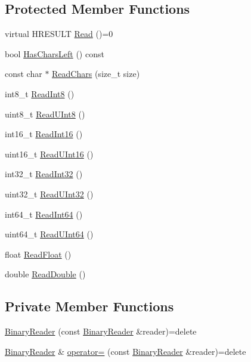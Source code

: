 \subsection*{Protected Member Functions}
\begin{DoxyCompactItemize}
\item 
virtual H\+R\+E\+S\+U\+LT \hyperlink{classmage_1_1_binary_reader_a000cf97b640a5fbd1d5c33ccaae7fb39}{Read} ()=0
\item 
bool \hyperlink{classmage_1_1_binary_reader_a35b10713dca7a416b73b28d5f6aaf600}{Has\+Chars\+Left} () const
\item 
const char $\ast$ \hyperlink{classmage_1_1_binary_reader_af1e0e4ab815e23c72ab65fd7c0748d3f}{Read\+Chars} (size\+\_\+t size)
\item 
int8\+\_\+t \hyperlink{classmage_1_1_binary_reader_abfc9296a42190b21ad0ddb6e0ea119af}{Read\+Int8} ()
\item 
uint8\+\_\+t \hyperlink{classmage_1_1_binary_reader_af0378b53d82b20ec703e09b325d7a5d2}{Read\+U\+Int8} ()
\item 
int16\+\_\+t \hyperlink{classmage_1_1_binary_reader_abb90a96c485b3acb1af3bb3bd88b76c5}{Read\+Int16} ()
\item 
uint16\+\_\+t \hyperlink{classmage_1_1_binary_reader_ad93616adef47e0256f117b8a6f8ba8bb}{Read\+U\+Int16} ()
\item 
int32\+\_\+t \hyperlink{classmage_1_1_binary_reader_a8a463e4e5469e90246a40f2898abbc67}{Read\+Int32} ()
\item 
uint32\+\_\+t \hyperlink{classmage_1_1_binary_reader_a4decb312a91e30406b82178268053f53}{Read\+U\+Int32} ()
\item 
int64\+\_\+t \hyperlink{classmage_1_1_binary_reader_a404b0bdd39f4f1cd52cb8360896ac851}{Read\+Int64} ()
\item 
uint64\+\_\+t \hyperlink{classmage_1_1_binary_reader_a480f2bd7320beed37a71b8122c8550bd}{Read\+U\+Int64} ()
\item 
float \hyperlink{classmage_1_1_binary_reader_af18ab2185b7c766c2183ab54f4676d57}{Read\+Float} ()
\item 
double \hyperlink{classmage_1_1_binary_reader_aa9d54a457a85d6f488d818c0a3e56560}{Read\+Double} ()
\end{DoxyCompactItemize}
\subsection*{Private Member Functions}
\begin{DoxyCompactItemize}
\item 
\hyperlink{classmage_1_1_binary_reader_a8c1ff948f1d056439f3d8cc37d7f507c}{Binary\+Reader} (const \hyperlink{classmage_1_1_binary_reader}{Binary\+Reader} \&reader)=delete
\item 
\hyperlink{classmage_1_1_binary_reader}{Binary\+Reader} \& \hyperlink{classmage_1_1_binary_reader_a0408bb456983b4a03ae42ab69c6f4bc3}{operator=} (const \hyperlink{classmage_1_1_binary_reader}{Binary\+Reader} \&reader)=delete
\end{DoxyCompactItemize}
